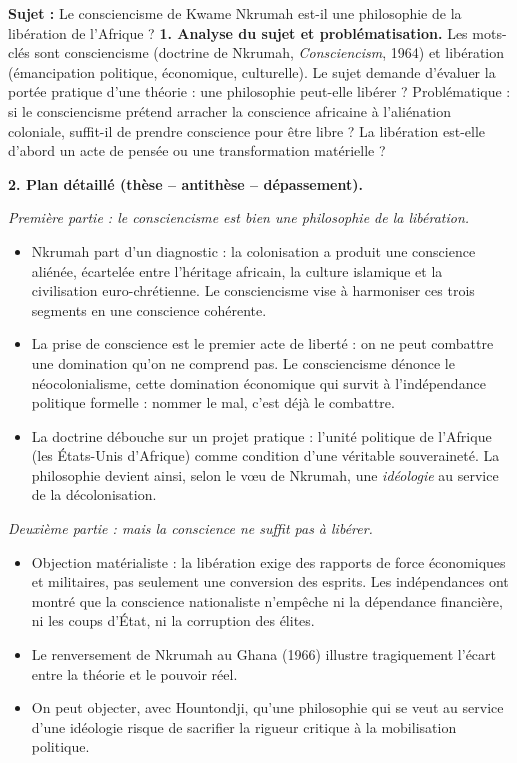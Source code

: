 \documentclass[11pt]{article}
\newcommand{\cle}[1]{{\popxbold\color{popdark}#1}}
\begin{document}
\begin{exoresolu}
\textbf{Sujet :} Le consciencisme de Kwame Nkrumah est-il une philosophie de la libération de l'Afrique ?
\tcblower
\textbf{1. Analyse du sujet et problématisation.} Les mots-clés sont \cle{consciencisme} (doctrine de Nkrumah, \emph{Consciencism}, 1964) et \cle{libération} (émancipation politique, économique, culturelle). Le sujet demande d'évaluer la portée pratique d'une théorie : une philosophie peut-elle libérer ? Problématique : si le consciencisme prétend arracher la conscience africaine à l'aliénation coloniale, suffit-il de prendre conscience pour être libre ? La libération est-elle d'abord un acte de pensée ou une transformation matérielle ?

\textbf{2. Plan détaillé (thèse -- antithèse -- dépassement).}

\emph{Première partie : le consciencisme est bien une philosophie de la libération.}
\begin{itemize}
\item Nkrumah part d'un diagnostic : la colonisation a produit une \cle{conscience aliénée}, écartelée entre l'héritage africain, la culture islamique et la civilisation euro-chrétienne. Le consciencisme vise à harmoniser ces trois segments en une conscience cohérente.
\item La prise de conscience est le premier acte de liberté : on ne peut combattre une domination qu'on ne comprend pas. Le consciencisme dénonce le \cle{néocolonialisme}, cette domination économique qui survit à l'indépendance politique formelle : nommer le mal, c'est déjà le combattre.
\item La doctrine débouche sur un projet pratique : l'unité politique de l'Afrique (les États-Unis d'Afrique) comme condition d'une véritable souveraineté. La philosophie devient ainsi, selon le vœu de Nkrumah, une \emph{idéologie} au service de la décolonisation.
\end{itemize}

\emph{Deuxième partie : mais la conscience ne suffit pas à libérer.}
\begin{itemize}
\item Objection matérialiste : la libération exige des rapports de force économiques et militaires, pas seulement une conversion des esprits. Les indépendances ont montré que la conscience nationaliste n'empêche ni la dépendance financière, ni les coups d'État, ni la corruption des élites.
\item Le renversement de Nkrumah au Ghana (1966) illustre tragiquement l'écart entre la théorie et le pouvoir réel.
\item On peut objecter, avec Hountondji, qu'une philosophie qui se veut au service d'une idéologie risque de sacrifier la rigueur critique à la mobilisation politique.
\end{itemize}


\end{exoresolu}
\end{document}
